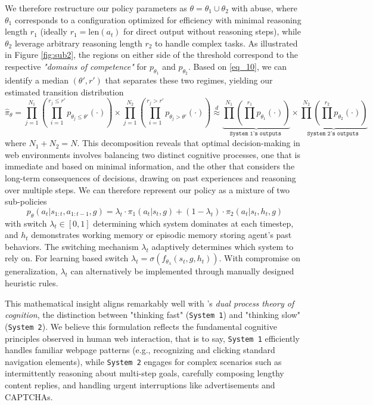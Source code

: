 \documentclass{article}
\begin{document}
We therefore restructure our policy parameters as $\theta = \theta_1 \cup \theta_2$ with abuse, where $\theta_1$ corresponds to a configuration optimized for efficiency with minimal reasoning length $r_1$ (ideally $r_1=\text{len}(a_t)$ for direct output without reasoning steps), while $\theta_2$ leverage arbitrary reasoning length $r_2$ to handle complex tasks. As illustrated in Figure \ref{fig:sub2}, the regions on either side of the threshold correspond to the respective \textit{"domains of competence"} for $p_{\theta_1}$ and $p_{\theta_2}$. Based on \eqref{eq_10}, we can identify a median $(\theta', r')$ that separates these two regimes, yielding our estimated transition distribution
\begin{equation}
\hat{\pi}_{\theta} = \prod_{j=1}^{N_1} (\prod_{i=1}^{r_j \le r'} p_{\theta_j \le \theta'}(\cdot)) \times  \prod_{j=1}^{N_2} (\prod_{i=1}^{r_j > r'} p_{\theta_j > \theta'}(\cdot))
\overset{d}{\approx} \underbrace{\prod^{N_1}(\prod^{r_1} p_{\theta_1}(\cdot))}_{\texttt{System 1's outputs }} \times \underbrace{\prod^{N_2}(\prod^{r_2} p_{\theta_2}(\cdot))}_{\texttt{System 2's outputs }}
\end{equation}
where $N_1+N_2=N$. This decomposition reveals that optimal decision-making in web environments involves balancing two distinct cognitive processes, one that is immediate and based on minimal information, and the other that considers the long-term consequences of decisions, drawing on past experiences and reasoning over multiple steps. We can therefore represent our policy as a mixture of two sub-policies 
\begin{equation}
p_\theta(a_t|s_{1:t},a_{1:t-1},g) = \lambda_t \cdot \pi_1(a_t|s_t, g) + (1-\lambda_t) \cdot \pi_2(a_t|s_t, h_t, g)
\end{equation}
with switch $\lambda_t \in [0,1]$ determining which system dominates at each timestep, and $h_t$ demonstrates working memory \citep{BADDELEY197447} or episodic memory \citep{nuxoll2007extending} storing agent's past behaviors. The switching mechanism $\lambda_t$ adaptively determines which system to rely on. For learning based switch $\lambda_t = \sigma(f_{\theta_{\lambda}}(s_t, g, h_t))$. With compromise on generalization, $\lambda_t$ can alternatively be implemented through manually designed heuristic rules. 

This mathematical insight aligns remarkably well with \citet{kahneman2011thinking}'s \textit{dual process theory of cognition}, the distinction between "thinking fast" (\texttt{System 1}) and "thinking slow" (\texttt{System 2}).   We believe this formulation reflects the fundamental cognitive principles observed in human web interaction, that is to say, \texttt{System 1} efficiently handles familiar webpage patterns (e.g., recognizing and clicking standard navigation elements), while \texttt{System 2} engages for complex scenarios such as intermittently reasoning about multi-step goals, carefully composing lengthy content replies, and handling urgent interruptions like advertisements and CAPTCHAs.
\end{document}
